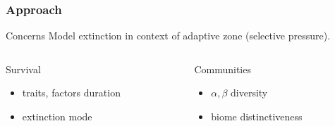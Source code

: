 \documentclass{beamer}
\begin{document}
\begin{frame} %
  \frametitle{Approach}

  \begin{block}{Concerns}
    Model extinction in context of adaptive zone (\alert{selective pressure}).
  \end{block}

  \vspace{1cm}

  \begin{columns}
    \begin{column}{0.5\textwidth}
      Survival
      \begin{itemize}
        \item traits, factors duration
        \item extinction mode
      \end{itemize}
    \end{column}
    \begin{column}{0.5\textwidth}
      Communities
      \begin{itemize}
        \item \(\alpha, \beta\) diversity
        \item biome distinctiveness
      \end{itemize}
    \end{column}
  \end{columns}

\end{frame}
\end{document}
